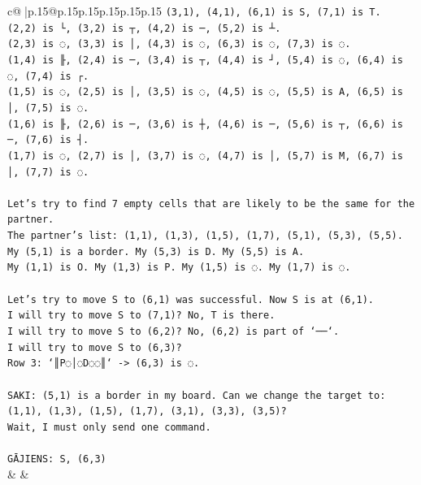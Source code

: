 \documentclass{article}
\begin{document}
{\begin{supertabular}{c@{$\;$}|p{.15\linewidth}@{}p{.15\linewidth}p{.15\linewidth}p{.15\linewidth}p{.15\linewidth}p{.15\linewidth}}
{{{\texttt{(3,1), (4,1), (6,1) is S, (7,1) is T.} \\
\texttt{(2,2) is └, (3,2) is ┬, (4,2) is ─, (5,2) is ┴.} \\
\texttt{(2,3) is ◌, (3,3) is │, (4,3) is ◌, (6,3) is ◌, (7,3) is ◌.} \\
\texttt{(1,4) is ╟, (2,4) is ─, (3,4) is ┬, (4,4) is ┘, (5,4) is ◌, (6,4) is ◌, (7,4) is ┌.} \\
\texttt{(1,5) is ◌, (2,5) is │, (3,5) is ◌, (4,5) is ◌, (5,5) is A, (6,5) is │, (7,5) is ◌.} \\
\texttt{(1,6) is ╟, (2,6) is ─, (3,6) is ┼, (4,6) is ─, (5,6) is ┬, (6,6) is ─, (7,6) is ┤.} \\
\texttt{(1,7) is ◌, (2,7) is │, (3,7) is ◌, (4,7) is │, (5,7) is M, (6,7) is │, (7,7) is ◌.} \\
\\ 
\texttt{Let's try to find 7 empty cells that are likely to be the same for the partner.} \\
\texttt{The partner's list: (1,1), (1,3), (1,5), (1,7), (5,1), (5,3), (5,5).} \\
\texttt{My (5,1) is a border. My (5,3) is D. My (5,5) is A.} \\
\texttt{My (1,1) is O. My (1,3) is P. My (1,5) is ◌. My (1,7) is ◌.} \\
\\ 
\texttt{Let's try to move S to (6,1) was successful. Now S is at (6,1).} \\
\texttt{I will try to move S to (7,1)? No, T is there.} \\
\texttt{I will try to move S to (6,2)? No, (6,2) is part of `──`.} \\
\texttt{I will try to move S to (6,3)?} \\
\texttt{Row 3: `║P◌│◌D◌◌║` {-}> (6,3) is ◌.} \\
\\ 
\texttt{SAKI: (5,1) is a border in my board. Can we change the target to: (1,1), (1,3), (1,5), (1,7), (3,1), (3,3), (3,5)?} \\
\texttt{Wait, I must only send one command.} \\
\\ 
\texttt{GĀJIENS: S, (6,3)} \\
            }
        }
    }
    & & \\ \\


\end{supertabular}}
\end{document}
